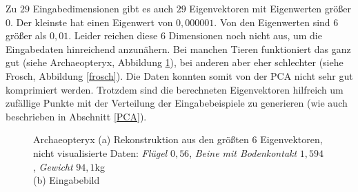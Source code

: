  Zu $29$ Eingabedimensionen gibt es auch $29$ Eigenvektoren mit Eigenwerten größer $0$. Der kleinste hat einen Eigenwert von $0,000001$. Von den Eigenwerten sind $6$ größer als $0,01$. Leider reichen diese $6$ Dimensionen noch nicht aus, um die Eingabedaten hinreichend anzunähern. Bei manchen Tieren funktioniert das ganz gut (siehe Archaeopteryx, Abbildung \ref{archaeopteryx}), bei anderen aber eher schlechter (siehe Frosch, Abbildung \ref{frosch}).
 Die Daten konnten somit von der PCA nicht sehr gut komprimiert werden. Trotzdem sind die berechneten Eigenvektoren hilfreich um zufällige Punkte mit der Verteilung der Eingabebeispiele zu generieren (wie auch beschrieben in Abschnitt \ref{PCA}).
 
 \begin{figure}
  \qquad
  
  \caption{Archaeopteryx (a) Rekonstruktion aus den größten $6$ Eigenvektoren, nicht visualisierte Daten: \emph{Flügel} $0,56$, \emph{Beine mit Bodenkontakt} $1,594$, \emph{Gewicht} $94,1$kg\\ 
  (b) Eingabebild}
  \label{archaeopteryx}
 \end{figure}
 
